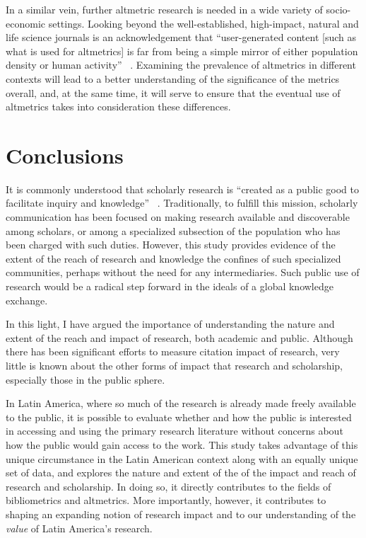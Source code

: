 In a similar vein, further altmetric research is needed in a wide variety of socio-economic settings. Looking beyond the well-established, high-impact, natural and life science journals is an acknowledgement that ``user-generated content [such as what is used for altmetrics] is far from being a simple mirror of either population density or human activity'' ~\citep[p. 26]{Graham2011}. Examining the prevalence of altmetrics in different contexts will lead to a better understanding of the significance of the metrics overall, and, at the same time, it will serve to ensure that the eventual use of altmetrics takes into consideration these differences.

\chapter{Conclusions}
\label{conclusions}

It is commonly understood that scholarly research is ``created as a public good to facilitate inquiry and knowledge'' ~\citep[n.p.]{ACRL2003}. Traditionally, to fulfill this mission, scholarly communication has been focused on making research available and discoverable among scholars, or among a specialized subsection of the population who has been charged with such duties. However, this study provides evidence of the extent of the reach of research and knowledge the confines of such specialized communities, perhaps without the need for any intermediaries. Such public use of research would be a radical step forward in the ideals of a global knowledge exchange.

In this light, I have argued the importance of understanding the nature and extent of the reach and impact of research, both academic and public. Although there has been significant efforts to measure citation impact of research, very little is known about the other forms of impact that research and scholarship, especially those in the public sphere.

In Latin America, where so much of the research is already made freely available to the public, it is possible to evaluate whether and how the public is interested in accessing and using the primary research literature without concerns about how the public would gain access to the work. This study takes advantage of this unique circumstance in the Latin American context along with an equally unique set of data, and explores the nature and extent of the of the impact and reach of research and scholarship. In doing so, it directly contributes to the fields of bibliometrics and altmetrics. More importantly, however, it contributes to shaping an expanding notion of research impact and to our understanding of the \emph{value} of Latin America's research.


